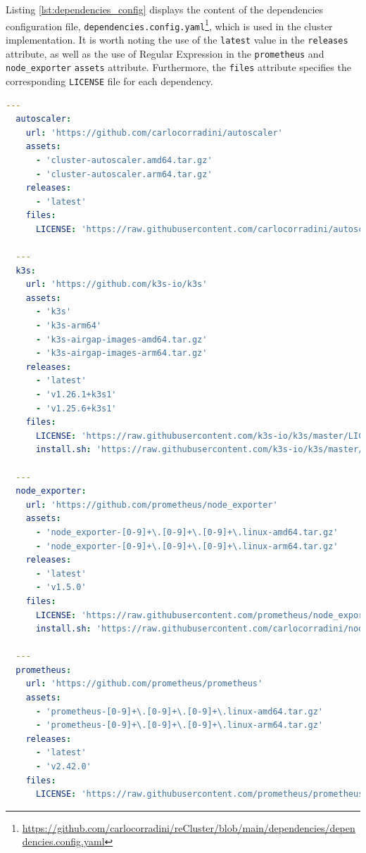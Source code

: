 Listing \ref{lst:dependencies_config} displays the content of the dependencies
configuration file, \texttt{dependencies.config.yaml}\footnote{\url{https://github.com/carlocorradini/reCluster/blob/main/dependencies/dependencies.config.yaml}},
which is used in the cluster implementation. It is worth noting the use of the
\texttt{latest} value in the \texttt{releases} attribute, as well as the use of Regular
Expression in the \texttt{prometheus} and \texttt{node\_exporter} \texttt{assets}
attribute. Furthermore, the \texttt{files} attribute specifies the corresponding
\texttt{LICENSE} file for each dependency.

\begin{lstlisting}[language=yaml, alsoletter={.}, morekeywords={[2]{autoscaler, k3s, node_exporter, prometheus, url, assets, releases, files, LICENSE, install.sh}}, xleftmargin=\parindent, label={lst:dependencies_config}, caption=Content of dependencies configuration file]
  ---
  autoscaler:
    url: 'https://github.com/carlocorradini/autoscaler'
    assets:
      - 'cluster-autoscaler.amd64.tar.gz'
      - 'cluster-autoscaler.arm64.tar.gz'
    releases:
      - 'latest'
    files:
      LICENSE: 'https://raw.githubusercontent.com/carlocorradini/autoscaler/master/LICENSE'

  ---
  k3s:
    url: 'https://github.com/k3s-io/k3s'
    assets:
      - 'k3s'
      - 'k3s-arm64'
      - 'k3s-airgap-images-amd64.tar.gz'
      - 'k3s-airgap-images-arm64.tar.gz'
    releases:
      - 'latest'
      - 'v1.26.1+k3s1'
      - 'v1.25.6+k3s1'
    files:
      LICENSE: 'https://raw.githubusercontent.com/k3s-io/k3s/master/LICENSE'
      install.sh: 'https://raw.githubusercontent.com/k3s-io/k3s/master/install.sh'

  ---
  node_exporter:
    url: 'https://github.com/prometheus/node_exporter'
    assets:
      - 'node_exporter-[0-9]+\.[0-9]+\.[0-9]+\.linux-amd64.tar.gz'
      - 'node_exporter-[0-9]+\.[0-9]+\.[0-9]+\.linux-arm64.tar.gz'
    releases:
      - 'latest'
      - 'v1.5.0'
    files:
      LICENSE: 'https://raw.githubusercontent.com/prometheus/node_exporter/master/LICENSE'
      install.sh: 'https://raw.githubusercontent.com/carlocorradini/node_exporter_installer/main/                  install.sh'

  ---
  prometheus:
    url: 'https://github.com/prometheus/prometheus'
    assets:
      - 'prometheus-[0-9]+\.[0-9]+\.[0-9]+\.linux-amd64.tar.gz'
      - 'prometheus-[0-9]+\.[0-9]+\.[0-9]+\.linux-arm64.tar.gz'
    releases:
      - 'latest'
      - 'v2.42.0'
    files:
      LICENSE: 'https://raw.githubusercontent.com/prometheus/prometheus/main/LICENSE'
\end{lstlisting}

